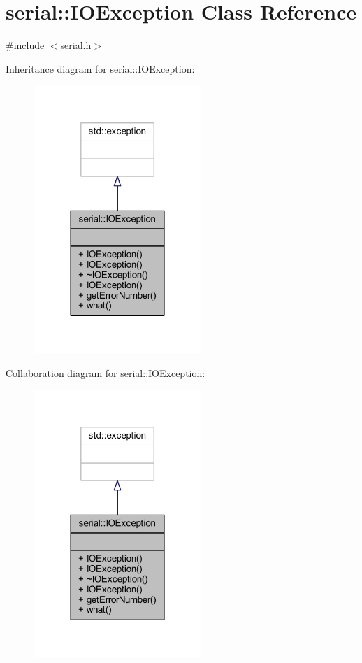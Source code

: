 \hypertarget{classserial_1_1_i_o_exception}{}\section{serial\+:\+:I\+O\+Exception Class Reference}
\label{classserial_1_1_i_o_exception}


{\ttfamily \#include $<$serial.\+h$>$}



Inheritance diagram for serial\+:\+:I\+O\+Exception\+:\nopagebreak
\begin{figure}[H]
\begin{center}
\leavevmode
\includegraphics[width=180pt]{classserial_1_1_i_o_exception__inherit__graph}
\end{center}
\end{figure}


Collaboration diagram for serial\+:\+:I\+O\+Exception\+:\nopagebreak
\begin{figure}[H]
\begin{center}
\leavevmode
\includegraphics[width=180pt]{classserial_1_1_i_o_exception__coll__graph}
\end{center}
\end{figure}
